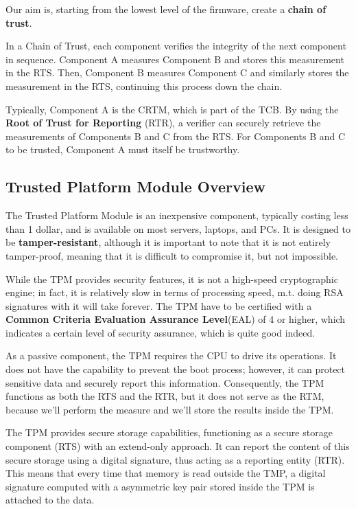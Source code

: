 Our aim is, starting from the lowest level of the firmware, create a
\textbf{chain of trust}.

In a Chain of Trust, each component verifies the integrity of the next
component in sequence. Component A measures Component B and stores
this measurement in the RTS. Then, Component B measures Component C
and similarly stores the measurement in the RTS, continuing this
process down the chain.

Typically, Component A is the CRTM, which is part of the TCB. By using
the \textbf{Root of Trust for Reporting} (RTR), a verifier can
securely retrieve the measurements of Components B and C from the RTS.
For Components B and C to be trusted, Component A must itself be
trustworthy.

\subsection{Trusted Platform Module Overview}

The Trusted Platform Module is an inexpensive component, typically
costing less than 1 dollar, and is available on most servers, laptops,
and PCs. It is designed to be \textbf{tamper-resistant}, although it
is important to note that it is not entirely tamper-proof, meaning
that it is difficult to compromise it, but not impossible.

While the TPM provides security features, it is not a high-speed
cryptographic engine; in fact, it is relatively slow in terms of
processing speed, m.t. doing RSA signatures with it will take forever.
The TPM have to be certified with a \textbf{Common Criteria Evaluation
Assurance Level}(EAL) of 4 or higher, which indicates a certain level
of security assurance, which is quite good indeed.

As a passive component, the TPM requires the CPU to drive its
operations. It does not have the capability to prevent the boot
process; however, it can protect sensitive data and securely report
this information. Consequently, the TPM functions as both the RTS and
the RTR, but it does not serve as the RTM, because we'll perform the
measure and we'll store the results inside the TPM.

The TPM provides secure storage capabilities, functioning as a secure
storage component (RTS) with an extend-only approach. It can report
the content of this secure storage using a digital signature, thus
acting as a reporting entity (RTR). This means that every time that
memory is read outside the TMP, a digital signature computed with a
asymmetric key pair stored inside the TPM is attached to the data.

